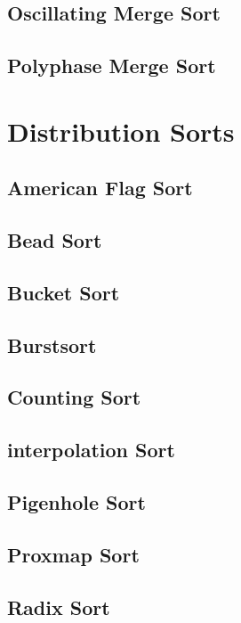 			\subsection{Oscillating Merge Sort}

			\subsection{Polyphase Merge Sort}

		\section{Distribution Sorts}
			\subsection{American Flag Sort}

			\subsection{Bead Sort}

			\subsection{Bucket Sort}

			\subsection{Burstsort}

			\subsection{Counting Sort}

			\subsection{interpolation Sort}

			\subsection{Pigenhole Sort}

			\subsection{Proxmap Sort}

			\subsection{Radix Sort}

